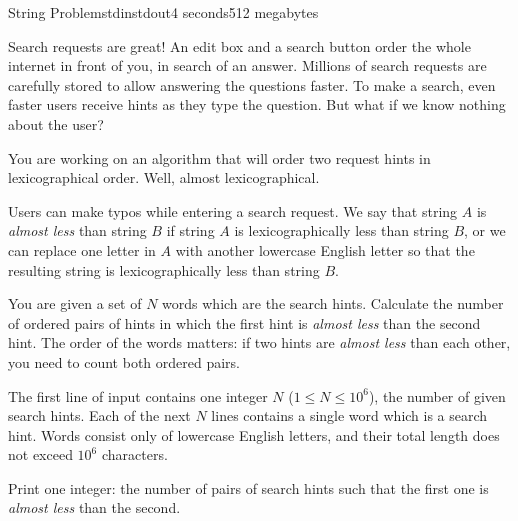 \begin{problem}{String Problem}{stdin}{stdout}{4 seconds}{512 megabytes}

Search requests are great! An edit box and a search button order the whole internet in front of you, in search of an answer. Millions of search requests are carefully stored to allow answering the questions faster. To make a search, even faster users receive hints as they type the question. But what if we know nothing about the user?

You are working on an algorithm that will order two request hints in lexicographical order. Well, almost lexicographical.

Users can make typos while entering a search request. We say that string $A$ is \emph{almost less} than string $B$ if string $A$ is lexicographically less than string $B$, or we can replace one letter in $A$ with another lowercase English letter so that the resulting string is lexicographically less than string $B$.

You are given a set of $N$ words which are the search hints. Calculate the number of ordered pairs of hints in which the first hint is \emph{almost less} than the second hint. The order of the words matters: if two hints are \emph{almost less} than each other, you need to count both ordered pairs.

\InputFile
The first line of input contains one integer $N$ ($1 \le N \le 10^6$), the number of given search hints.
Each of the next $N$ lines contains a single word which is a search hint.
Words consist only of lowercase English letters, and their total length does not exceed $10^6$ characters.


\OutputFile
Print one integer: the number of pairs of search hints such that the first one is \emph{almost less} than the second.


\Examples

\begin{example}
%
%
%
\end{example}

\end{problem}
